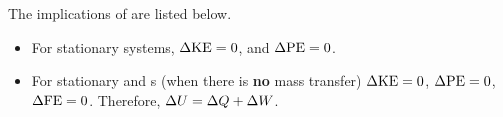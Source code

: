The implications of  are listed below.
\begin{itemize}[noitemsep]
\item For stationary systems, $\Delta \mathrm{KE} = 0$, and $\Delta \mathrm{PE} = 0$.
\item For stationary and s (when there is \textbf{no} mass transfer) $\Delta \mathrm{KE} = 0$, $\Delta \mathrm{PE} = 0$, $\Delta \mathrm{FE} = 0$.
  Therefore, $\Delta U = \Delta Q + \Delta W$.
\end{itemize}


